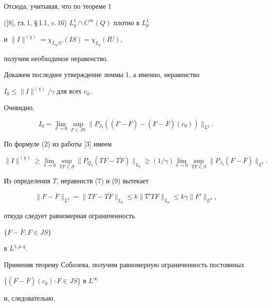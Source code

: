Отсюда, учитывая, что по теореме 1


([8], гл.\,1, \S\,1.1, c.\,16) $L^1_p\cap C^{\infty}(Q)$ плотно в $L^1_p$


и $\|I\|^{(\chi)}=\chi_{L_q/C}(IS)=\chi_{L_q}(IU)$,


получим необходимое неравенство.





Докажем последнее утверждение леммы 1, а именно, неравенство


$I_0\le\|I\|^{(\chi)}/\gamma$ для всех $c_0$.


Очевидно,


\begin{equation}


I_0=\lim_{\delta\to 0} \sup\limits_{F\in JS} \|P_{J_{\delta}}


((F-\overline F)-(F-\overline F)(c_0))\|_{L^q}.


\end{equation}


По формуле (2) из работы [3] имеем


\begin{equation}


\|I\|^{(\chi)} \ge \lim_{\delta\to 0} \sup\limits_{TF\in S}


\|P_{Q_{\delta}}(TF-\overline{TF})\|_{L_q}\ge


(1/\gamma)\lim_{\delta\to 0} \sup\limits_{TF\in S} \|P_{J_{\delta}}


(F-\overline{F})\|_{L^q}.


\end{equation}


Из определения $T$, неравенств (7) и (9) вытекает


$$


\|F-\overline F\|_{L^q}=\|TF-\overline{TF}\|_{L_q}\le k\|\nabla TF\|_{L_p}


\le k\gamma\|F'\|_{L^p},


$$


откуда следует равномерная ограниченность


$\{F-\overline F: F\in JS\}$


в $L^{1,p,q}$.


Применяя теорему Соболева, получим равномерную ограниченность постоянных


$\{(F-\overline F)(c_0): F\in JS\}$ в $L^{\infty}$


и, следовательно,


$$



